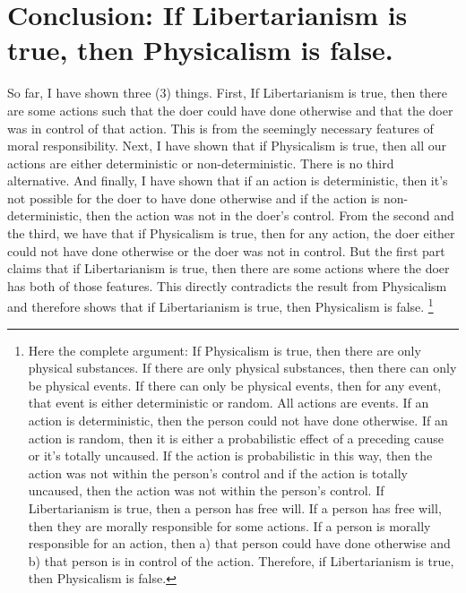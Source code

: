 \section{Conclusion: If Libertarianism is true, then Physicalism is false.}

So far, I have shown three (3) things. First, If Libertarianism is true, then there are some actions such that the doer could have done otherwise and that the doer was in control of that action. This is from the seemingly necessary features of moral responsibility. Next, I have shown that if Physicalism is true, then all our actions are either deterministic or non-deterministic. There is no third alternative. And finally, I have shown that if an action is deterministic, then it's not possible for the doer to have done otherwise and if the action is non-deterministic, then the action was not in the doer's control. From the second and the third, we have that if Physicalism is true, then for any action, the doer either could not have done otherwise or the doer was not in control. But the first part claims that if Libertarianism is true, then there are some actions where the doer has both of those features. This directly contradicts the result from Physicalism and therefore shows that if Libertarianism is true, then Physicalism is false. \footnote{Here the complete argument: If Physicalism is true, then there are only physical substances. If there are only physical substances, then there can only be physical events. If there can only be physical events, then for any event, that event is either deterministic or random. All actions are events. If an action is deterministic, then the person could not have done otherwise. If an action is random, then it is either a probabilistic effect of a preceding cause or it’s totally uncaused. If the action is probabilistic in this way, then the action was not within the person’s control and if the action is totally uncaused, then the action was not within the person’s control. If Libertarianism is true, then a person has free will. If a person has free will, then they are morally responsible for some actions. If a person is morally responsible for an action, then a) that person could have done otherwise and b) that person is in control of the action. Therefore, if Libertarianism is true, then Physicalism is false.}

\setcounter{footnote}{\thefc}


